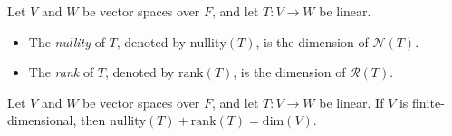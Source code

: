 \begin{definition}
  Let $V$ and $W$ be vector spaces over $F$, and let $T: V \to W$ be linear.
  \begin{itemize}
    \item The \emph{nullity} of $T$, denoted by $\mathrm{nullity}(T)$,
      is the dimension of $\mathcal{N}(T)$.
    \item The \emph{rank} of $T$, denoted by $\mathrm{rank}(T)$,
      is the dimension of $\mathcal{R}(T)$.
  \end{itemize}
\end{definition}

\begin{theorem}
  Let $V$ and $W$ be vector spaces over $F$, and let $T: V \to W$ be linear.
  If $V$ is finite-dimensional, then
  $\mathrm{nullity}(T) + \mathrm{rank}(T) = \mathrm{dim}(V)$.
\end{theorem}
